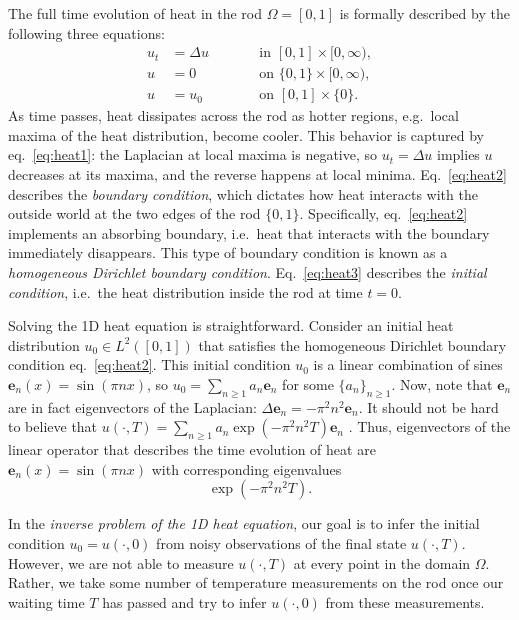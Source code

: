 \documentclass[ba]{imsart}
\newcommand{\ev}{\mathbf{e}} \newcommand{\func}{\mathbf{a}}
\theoremstyle{plain}
\theoremstyle{definition}
\theoremstyle{remark}
\begin{document}
The full time evolution of heat in the rod $\Omega=[0,1]$ is formally
described by the following three equations:
\begin{subequations}
  \begin{alignat}{2}
    u_t &= \Delta u &&\qquad \text{in } [0,1] \times [0,\infty), \label{eq:heat1}\\
    u &= 0 &&\qquad \text{on } \{0, 1\} \times [0,\infty), \label{eq:heat2}\\
    u &= u_0 &&\qquad \text{on }[0,1] \times \{0\}. \label{eq:heat3}
  \end{alignat}
\end{subequations}
As time passes, heat dissipates across the rod as hotter regions,
e.g.~local maxima of the heat distribution, become cooler. This
behavior is captured by eq.~\eqref{eq:heat1}: the Laplacian at local
maxima is negative, so $u_t = \Delta u$ implies $u$ decreases at its
maxima, and the reverse happens at local minima. Eq.~\eqref{eq:heat2}
describes the \emph{boundary condition}, which dictates how heat
interacts with the outside world at the two edges of the rod
$\{0,1\}$. Specifically, eq.~\eqref{eq:heat2} implements an absorbing
boundary, i.e.~heat that interacts with the boundary immediately
disappears. This type of boundary condition is known as a
\emph{homogeneous Dirichlet boundary condition}. Eq.~\eqref{eq:heat3}
describes the \emph{initial condition}, i.e.~the heat distribution
inside the rod at time $t=0$.

Solving the 1D heat equation is straightforward. Consider an initial
heat distribution $u_0\in L^2([0,1])$ that satisfies the homogeneous
Dirichlet boundary condition eq.~\eqref{eq:heat2}. This initial
condition $u_0$ is a linear combination of sines $\ev_n(x) = \sin(\pi
n x)$, so $u_0 = \sum_{n\geq 1} a_n \ev_n$ for some $\{a_n\}_{n\geq
  1}$. Now, note that $\ev_n$ are in fact eigenvectors of the
Laplacian: $\Delta \ev_n = -\pi^2 n^2\ev_n$. It should not be hard to
believe that $u(\cdot, T) = \sum_{n\geq 1} a_n \exp(-\pi^2 n^2T )
\ev_n$ \cite{renardy2006PDE}. Thus, eigenvectors of the linear
operator that describes the time evolution of heat are $\ev_n(x) =
\sin(\pi n x)$ with corresponding eigenvalues
\begin{equation}\label{eq:decay}
  \exp(-\pi^2 n^2T ).
\end{equation}

In the \emph{inverse problem of the 1D heat equation}, our goal is to
infer the initial condition $u_0 = u(\cdot, 0)$ from noisy
observations of the final state $u(\cdot, T)$. However, we are not
able to measure $u(\cdot, T)$ at every point in the domain
$\Omega$. Rather, we take some number of temperature measurements on
the rod once our waiting time $T$ has passed and try to infer
$u(\cdot, 0)$ from these measurements.
\end{document}
